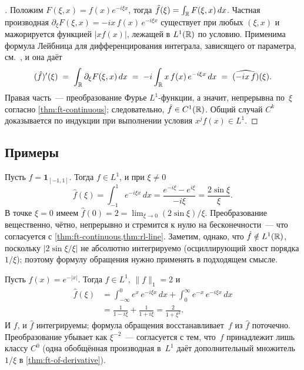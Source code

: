 \begin{proof}[]
Положим $F(\xi, x) = f(x) e^{-i \xi x}$, тогда
$\hat f(\xi) = \int_{\mathbb{R}} F(\xi, x)\, dx$. Частная производная
$\partial_\xi F(\xi, x) = -i x\, f(x)\, e^{-i \xi x}$ существует при
любых $(\xi, x)$ и мажорируется функцией $|x f(x)|$, лежащей в
$L^1(\mathbb{R})$ по условию. Применима формула Лейбница для дифференцирования
интеграла, зависящего от параметра, см.\
\cite[Т.~II, гл.~XVII]{Zorich1981}, и она даёт
\[
  (\hat f)'(\xi) \;=\; \int_{\mathbb{R}} \partial_\xi F(\xi, x)\, dx
                 \;=\; -i \int_{\mathbb{R}} x\, f(x)\, e^{-i \xi x}\, dx
                 \;=\; \widehat{(- i x\, f)}(\xi).
\]
Правая часть~--- преобразование Фурье $L^1$-функции, а значит,
непрерывна по~$\xi$ согласно \cref{thm:ft-continuous}; следовательно,
$\hat f \in C^1(\mathbb{R})$. Общий случай $C^k$ доказывается по индукции при
выполнении условия $x^j f(x) \in L^1$.
\end{proof}

\subsection*{Примеры}

\begin{example}
\label{ex:ft-indicator}
Пусть $f = \mathbf{1}_{[-1, 1]}$. Тогда $f \in L^1$, и при $\xi \neq 0$
\[
  \hat f(\xi) = \int_{-1}^{1} e^{-i \xi x}\, dx
              = \frac{e^{-i \xi} - e^{i \xi}}{-i\xi}
              = \frac{2 \sin \xi}{\xi}.
\]
В точке $\xi = 0$ имеем $\hat f(0) = 2 = \lim_{\xi \to 0} (2 \sin \xi)/\xi$.
Преобразование вещественно, чётно, непрерывно и стремится к нулю на
бесконечности~--- что согласуется с
\cref{thm:ft-continuous,thm:rl-line}. Заметим, однако, что
$\hat f \notin L^1(\mathbb{R})$, поскольку $|2 \sin \xi / \xi|$ не абсолютно
интегрируемо (осциллирующий хвост порядка $1/\xi$); поэтому формулу
обращения нужно применять в подходящем смысле.
\end{example}

\begin{example}
\label{ex:ft-double-exp}
Пусть $f(x) = e^{-|x|}$. Тогда $f \in L^1$, $\|f\|_1 = 2$ и
\begin{align*}
  \hat f(\xi)
  &= \int_{-\infty}^{0} e^{x}\, e^{-i\xi x}\, dx + \int_{0}^{\infty} e^{-x}\, e^{-i\xi x}\, dx \\
  &= \frac{1}{1 - i\xi} + \frac{1}{1 + i\xi}
   = \frac{2}{1 + \xi^2}.
\end{align*}
И $f$, и $\hat f$ интегрируемы; формула обращения восстанавливает~$f$
из $\hat f$ поточечно. Преобразование убывает как $\xi^{-2}$~---
согласуется с тем, что~$f$ принадлежит лишь классу $C^0$ (одна
обобщённая производная в~$L^1$ даёт дополнительный множитель $1/\xi$ в
\cref{thm:ft-of-derivative}).
\end{example}

